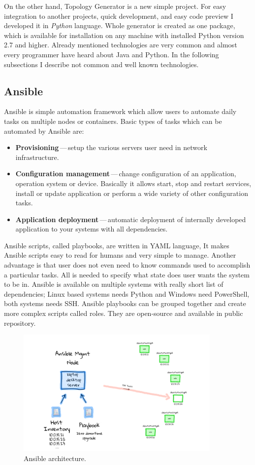 On the other hand, Topology Generator is a new simple project. For easy integration to another projects, quick development, and easy code preview I developed it in \emph{Python} language. Whole generator is created as one package, which is available for installation on any machine with installed Python version 2.7 and higher. Already mentioned technologies are very common and almost every programmer have heard about Java and Python. In the following subsections I describe not common and well known technologies.

\subsection{Ansible}
Ansible \cite{Ansible} is simple automation framework which allow users to automate daily tasks on multiple nodes or containers. Basic types of tasks which can be automated by Ansible are:

\begin{itemize}
	\item \textbf{Provisioning}\,---\,setup the various servers user need in network infrastructure.
	\item \textbf{Configuration management}\,---\,change configuration of an application, operation system or device. Basically it allows start, stop and restart services, install or update application or perform a wide variety of other configuration tasks.
	\item \textbf{Application deployment}\,---\,automatic deployment of internally developed application to your systems with all dependencies.
\end{itemize}

Ansible scripts, called playbooks, are written in YAML language, It makes Ansible scripts easy to read for humans and very simple to manage. Another advantage is that user does not even need to know commands used to accomplish a particular tasks. All is needed to specify what state does user wants the system to be in. Ansible is available on multiple systems with really short list of dependencies; Linux based systems needs Python and Windows need PowerShell, both systems needs SSH. Ansible playbooks can be grouped together and create more complex scripts called roles. They are open-source and available in public repository.

\begin{figure}[H]
  \centering
  \includegraphics[width=10cm]{obrazky-figures/ansible.png}
  \caption{Ansible architecture. }
  \label{fig:ansible_architecture}
\end{figure}

